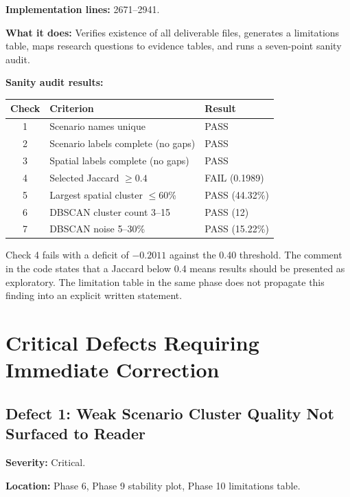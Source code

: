 \documentclass[11pt]{article}
\begin{document}
\textbf{Implementation lines:} 2671--2941.

\textbf{What it does:} Verifies existence of all deliverable files, generates
a limitations table, maps research questions to evidence tables, and runs a
seven-point sanity audit.

\textbf{Sanity audit results:}

\begin{center}
\begin{tabular}{|c|l|l|}
\hline
Check & Criterion & Result \\
\hline
1 & Scenario names unique & \textcolor{passgreen}{PASS} \\
2 & Scenario labels complete (no gaps) & \textcolor{passgreen}{PASS} \\
3 & Spatial labels complete (no gaps) & \textcolor{passgreen}{PASS} \\
4 & Selected Jaccard $\geq 0.4$ & \textcolor{failred}{FAIL} (0.1989) \\
5 & Largest spatial cluster $\leq 60$\% & \textcolor{passgreen}{PASS} (44.32\%) \\
6 & DBSCAN cluster count 3--15 & \textcolor{passgreen}{PASS} (12) \\
7 & DBSCAN noise 5--30\% & \textcolor{passgreen}{PASS} (15.22\%) \\
\hline
\end{tabular}
\end{center}

Check 4 fails with a deficit of $-0.2011$ against the 0.40 threshold. The comment
in the code states that a Jaccard below 0.4 means results should be presented as
exploratory. The limitation table in the same phase does not propagate this
finding into an explicit written statement.

\section{Critical Defects Requiring Immediate Correction}

\subsection{Defect 1: Weak Scenario Cluster Quality Not Surfaced to Reader}

\textbf{Severity:} Critical.

\textbf{Location:} Phase 6, Phase 9 stability plot, Phase 10 limitations table.
\end{document}
